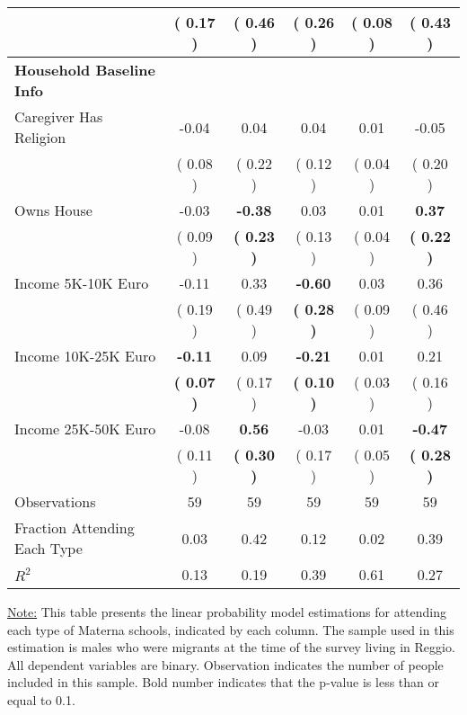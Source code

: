 \begin{table}[H]
{\begin{tabular}{lccccc}
\quad  & (     0.17 ) & (     0.46 )  & (     0.26 )  & (     0.08 ) & (     0.43 ) \\
\midrule
\textbf{Household Baseline Info} \\
\quad Caregiver Has Religion &     -0.04 &      0.04 &      0.04 &      0.01 &     -0.05 \\
\quad  & (     0.08 ) & (     0.22 )  & (     0.12 )  & (     0.04 ) & (     0.20 ) \\
\quad Owns House &     -0.03 & \textbf{    -0.38} &      0.03 &      0.01 & \textbf{     0.37} \\
\quad  & (     0.09 ) & \textbf{(     0.23 )}  & (     0.13 )  & (     0.04 ) & \textbf{(     0.22 )} \\
\quad Income 5K-10K Euro &     -0.11 &      0.33 & \textbf{    -0.60} &      0.03 &      0.36 \\
\quad  & (     0.19 ) & (     0.49 )  & \textbf{(     0.28 )}  & (     0.09 ) & (     0.46 ) \\
\quad Income 10K-25K Euro & \textbf{    -0.11} &      0.09 & \textbf{    -0.21} &      0.01 &      0.21 \\
\quad  & \textbf{(     0.07 )} & (     0.17 )  & \textbf{(     0.10 )}  & (     0.03 ) & (     0.16 ) \\
\quad Income 25K-50K Euro &     -0.08 & \textbf{     0.56} &     -0.03 &      0.01 & \textbf{    -0.47} \\
\quad  & (     0.11 ) & \textbf{(     0.30 )}  & (     0.17 )  & (     0.05 ) & \textbf{(     0.28 )} \\
\midrule
Observations & 59 & 59 & 59 & 59 & 59 \\
Fraction Attending Each Type &      0.03 &      0.42 &      0.12 &      0.02 &      0.39 \\
\midrule
$ R^2$ &      0.13 &      0.19 &      0.39 &      0.61 &      0.27 \\
\bottomrule
\end{tabular}}
\end{table}
\begin{footnotesize}
\noindent\underline{Note:} This table presents the linear probability model estimations for attending each type of Materna schools, indicated by each column. The sample used in this estimation is males who were migrants at the time of the survey living in Reggio. All dependent variables are binary. Observation indicates the number of people included in this sample. Bold number indicates that the p-value is less than or equal to 0.1.
\end{footnotesize}
